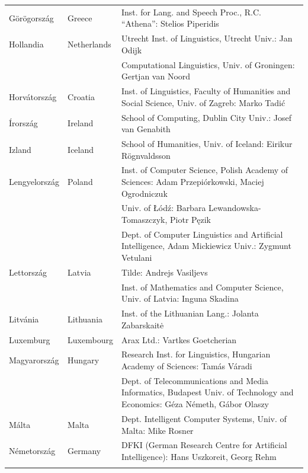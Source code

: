 \begin{longtable}{llp{105mm}}
    Görögország & \textcolor{grey1}{Greece} & Inst. for Lang. and Speech Proc., R.C. “Athena”: Stelios Piperidis\\ \addlinespace
     Hollandia & \textcolor{grey1}{Netherlands} & Utrecht Inst. of Linguistics, Utrecht Univ.: Jan Odijk\\ \addlinespace 
    & & Computational Linguistics, Univ. of Groningen: Gertjan van Noord\\ \addlinespace
     Horvátország & \textcolor{grey1}{Croatia} & Inst. of Linguistics, Faculty of Humanities and Social Science, Univ. of Zagreb: Marko Tadić \\ \addlinespace
      Írország & \textcolor{grey1}{Ireland} & School of Computing, Dublin City Univ.: Josef van Genabith\\ \addlinespace
    Izland & \textcolor{grey1}{Iceland} & School of Humanities, Univ. of Iceland: Eirikur Rögnvaldsson\\ \addlinespace
    Lengyelország & \textcolor{grey1}{Poland} & Inst. of Computer Science, Polish Academy of Sciences: Adam Przepiórkowski, Maciej Ogrodniczuk \\ \addlinespace
    & & Univ. of Łódź: Barbara Lewandowska-Tomaszczyk, Piotr Pęzik\\ \addlinespace
    & & Dept. of Computer Linguistics and Artificial Intelligence, Adam Mickiewicz Univ.: Zygmunt Vetulani \\ \addlinespace
    Lettország & \textcolor{grey1}{Latvia} & Tilde: Andrejs Vasiljevs\\ \addlinespace 
    & & Inst. of Mathematics and Computer Science, Univ. of Latvia: Inguna Skadina\\ \addlinespace
    Litvánia & \textcolor{grey1}{Lithuania} & Inst. of the Lithuanian Lang.: Jolanta Zabarskaitė\\ \addlinespace
    Luxemburg & \textcolor{grey1}{Luxembourg} & Arax Ltd.: Vartkes Goetcherian\\ \addlinespace
    Magyarország & \textcolor{grey1}{Hungary} & Research Inst. for Linguistics, Hungarian Academy of Sciences: Tamás Váradi\\  \addlinespace
    & & Dept. of Telecommunications and Media Informatics, Budapest Univ. of Technology and Economics: Géza Németh, Gábor Olaszy\\ \addlinespace
    Málta & \textcolor{grey1}{Malta} & Dept. Intelligent Computer Systems, Univ. of Malta: Mike Rosner\\ \addlinespace
    Németország & \textcolor{grey1}{Germany} & DFKI (German Research Centre for Artificial Intelligence): Hans Uszkoreit, Georg Rehm\\ \addlinespace

\end{longtable}
